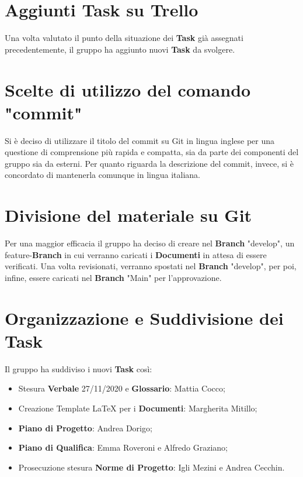 	\section{Aggiunti Task su Trello}
	Una volta valutato il punto della situazione dei \textbf{Task} già assegnati precedentemente, il gruppo ha aggiunto nuovi \textbf{Task} da svolgere.
	
	\section{Scelte di utilizzo del comando "commit"}
	Si è deciso di utilizzare il titolo del commit su Git in lingua inglese per una questione di comprensione più rapida e compatta, sia da parte dei componenti del gruppo sia da esterni.
	Per quanto riguarda la descrizione del commit, invece, si è concordato di mantenerla comunque in lingua italiana.
	
	\section{Divisione del materiale su Git}
	Per una maggior efficacia il gruppo ha deciso di creare nel \textbf{Branch} "develop", un feature-\textbf{Branch} in cui verranno caricati i \textbf{Documenti}
	in attesa di essere verificati. 
	Una volta revisionati, verranno spostati nel \textbf{Branch} "develop", per poi, infine, essere caricati nel \textbf{Branch}  "Main" per l'approvazione.
	
	\section{Organizzazione e Suddivisione dei Task}
	Il gruppo ha suddiviso i nuovi \textbf{Task} così:
	\begin{itemize}
		\item Stesura \textbf{Verbale} 27/11/2020 e \textbf{Glossario}: Mattia Cocco;
		\item Creazione Template LaTeX per i \textbf{Documenti}: Margherita Mitillo;
		\item \textbf{Piano di Progetto}: Andrea Dorigo;
		\item \textbf{Piano di Qualifica}: Emma Roveroni e Alfredo Graziano;
		\item Prosecuzione stesura \textbf{Norme di Progetto}: Igli Mezini e Andrea Cecchin.	
	\end{itemize}
	